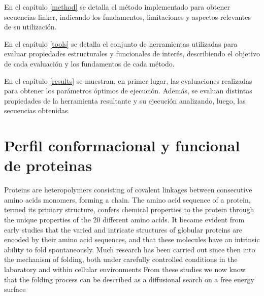 En el capítulo \ref{method} se detalla el método implementado para obtener secuencias linker, indicando los fundamentos, limitaciones y aspectos relevantes de su utilización.

En el capítulo \ref{tools} se detalla el conjunto de herramientas utilizadas para evaluar propiedades estructurales y funcionales de interés, describiendo el objetivo de cada evaluación y los fundamentos de cada método. 

En el capítulo \ref{results} se muestran, en primer lugar, las evaluaciones realizadas para obtener los parámetros óptimos de ejecución. 
Además, se evaluan distintas propiedades de la herramienta resultante y su ejecución analizando, luego, las secuencias obtenidas. 

































\section{Perfil conformacional y funcional de proteinas}\label{proteinLandscape}

Proteins are heteropolymers consisting of covalent linkages between consecutive amino acids monomers, forming a chain. 
The amino acid sequence of a protein, termed its primary structure, confers chemical properties to the protein through the unique properties of the 20 different amino acids.
It became evident from early studies that the varied and intricate structures of globular proteins are encoded by their amino acid sequences, and that these molecules have an intrinsic ability to fold spontaneously.
Much research has been carried out since then into the mechanism of folding, both under carefully controlled conditions in the laboratory and within cellular environments
From these studies we now know that the folding process can be described as a diffusional search on a free energy surface



